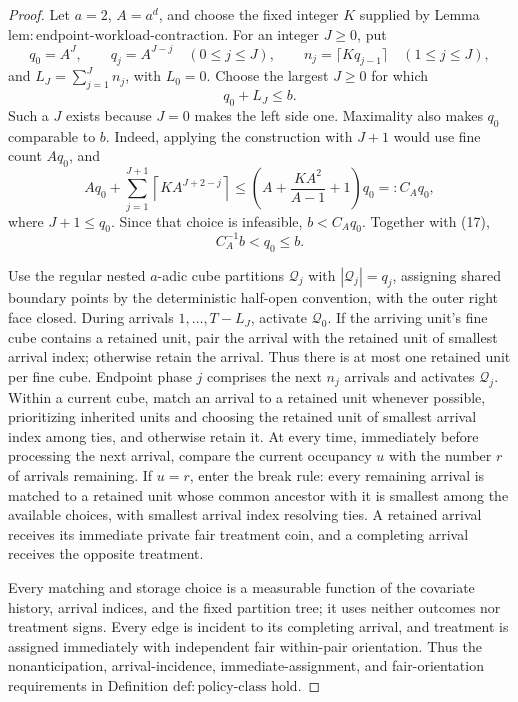 \documentclass{article}
\begin{document}
\begin{proof}
Let \(a=2\), \(A=a^d\), and choose the fixed integer \(K\) supplied by Lemma \(\mathrm{lem:endpoint\text{-}workload\text{-}contraction}\).  For an integer \(J\ge0\), put
\[
 q_0=A^J,\qquad q_j=A^{J-j}\quad(0\le j\le J),
 \qquad n_j=\lceil Kq_{j-1}\rceil\quad(1\le j\le J),
\]
and \(L_J=\sum_{j=1}^Jn_j\), with \(L_0=0\).  Choose the largest \(J\ge0\) for which
\[
 q_0+L_J\le b. \tag{17}
\]
Such a \(J\) exists because \(J=0\) makes the left side one.  Maximality also makes \(q_0\) comparable to \(b\).  Indeed, applying the construction with \(J+1\) would use fine count \(Aq_0\), and
\[
 Aq_0+\sum_{j=1}^{J+1}\left\lceil K A^{J+2-j}\right\rceil
 \le \left(A+\frac{KA^2}{A-1}+1\right)q_0=:C_Aq_0, \tag{18}
\]
where \(J+1\le q_0\).  Since that choice is infeasible, \(b<C_Aq_0\).  Together with (17),
\[
 C_A^{-1}b<q_0\le b. \tag{19}
\]

Use the regular nested \(a\)-adic cube partitions \(\mathcal Q_j\) with \(|\mathcal Q_j|=q_j\), assigning shared boundary points by the deterministic half-open convention, with the outer right face closed.  During arrivals \(1,\ldots,T-L_J\), activate \(\mathcal Q_0\).  If the arriving unit's fine cube contains a retained unit, pair the arrival with the retained unit of smallest arrival index; otherwise retain the arrival.  Thus there is at most one retained unit per fine cube.  Endpoint phase \(j\) comprises the next \(n_j\) arrivals and activates \(\mathcal Q_j\).  Within a current cube, match an arrival to a retained unit whenever possible, prioritizing inherited units and choosing the retained unit of smallest arrival index among ties, and otherwise retain it.  At every time, immediately before processing the next arrival, compare the current occupancy \(u\) with the number \(r\) of arrivals remaining.  If \(u=r\), enter the break rule: every remaining arrival is matched to a retained unit whose common ancestor with it is smallest among the available choices, with smallest arrival index resolving ties.  A retained arrival receives its immediate private fair treatment coin, and a completing arrival receives the opposite treatment.

Every matching and storage choice is a measurable function of the covariate history, arrival indices, and the fixed partition tree; it uses neither outcomes nor treatment signs.  Every edge is incident to its completing arrival, and treatment is assigned immediately with independent fair within-pair orientation.  Thus the nonanticipation, arrival-incidence, immediate-assignment, and fair-orientation requirements in Definition \(\mathrm{def:policy\text{-}class}\) hold.


\end{proof}
\end{document}
